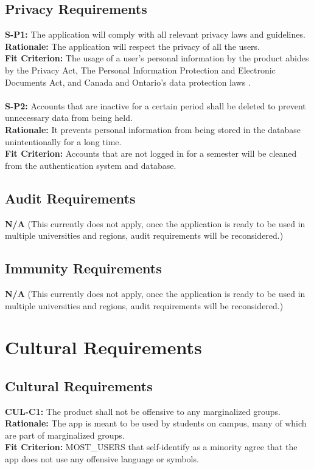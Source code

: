 \documentclass[12pt]{article}
\begin{document}
\subsection{Privacy Requirements}
  \textbf{S-P1:} The application will comply with all relevant privacy laws and guidelines.\\
  \textbf{Rationale:} The application will respect the privacy of all the users.\\
  \textbf{Fit Criterion:} The usage of a user's personal information by the product abides by the Privacy Act, The Personal Information Protection and Electronic Documents Act, and Canada and Ontario’s data protection laws \cite{Legislative Services} \cite{CFLC}.\\\\
  \textbf{S-P2:} Accounts that are inactive for a certain period shall be deleted to prevent unnecessary data from being held.\\
  \textbf{Rationale:} It prevents personal information from being stored in the database unintentionally for a long time.\\
  \textbf{Fit Criterion:} Accounts that are not logged in for a semester will be cleaned from the authentication system and database.

\subsection{Audit Requirements}
  \textbf{N/A} (This currently does not apply, once the application is ready to be used in multiple universities and regions, audit requirements will be reconsidered.)\\

\subsection{Immunity Requirements}
  \textbf{N/A} (This currently does not apply, once the application is ready to be used in multiple universities and regions, audit requirements will be reconsidered.)\\

\section{Cultural Requirements}
\subsection{Cultural Requirements}
  \textbf{CUL-C1:} The product shall not be offensive to any marginalized groups.\\
  \textbf{Rationale:} The app is meant to be used by students on campus, many of which are part of marginalized groups.\\
  \textbf{Fit Criterion:} MOST\_USERS that self-identify as a minority agree that the app does not use any offensive language or symbols.\\\\
\end{document}
